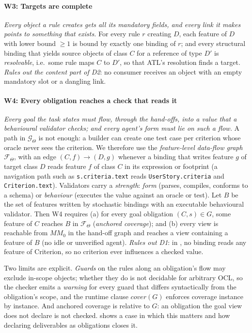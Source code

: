 \documentclass[10pt,a4paper]{article}
\newcommand{\Team}{\Theta}
\newcommand{\W}[1]{\textsf{W#1}}
\newcommand{\D}[1]{\textsf{D#1}}
\newcommand{\MM}{\mathit{MM}}
\newcommand{\cls}[1]{\textsf{#1}}
\newcommand{\code}[1]{\texttt{#1}}
\begin{document}
\paragraph{\W{3}: Targets are complete} \emph{Every object a rule creates
gets all its mandatory fields, and every link it makes points to something
that exists.} For every rule $r$ creating $D$, each feature of $D$ with
lower bound $\ge 1$ is bound by exactly one binding of $r$; and every
structural binding that yields source objects of class $C$ for a reference
of type $D'$ is \emph{resolvable}, i.e.\ some rule maps $C$ to $D'$, so
that ATL's resolution finds a target. \emph{Rules out the content part of
\D{2}}: no consumer receives an object with an empty mandatory slot or a
dangling link.

\paragraph{\W{4}: Every obligation reaches a check that reads it}
\emph{Every goal the task states must flow, through the hand-offs, into a
value that a behavioural validator checks; and every agent's form must lie
on such a flow.} A path in $\mathcal{G}_\Team$ is not enough: a builder can
create one test case per criterion whose oracle never sees the criterion.
We therefore use the \emph{feature-level data-flow graph}
$\mathcal{F}_\Team$, with an edge $(C,f)\to(D,g)$ whenever a binding that
writes feature $g$ of target class $D$ reads feature $f$ of class $C$ in
its expression or footprint (a navigation path such as
\code{s.criteria.text} reads \code{UserStory.criteria} and
\code{Criterion.text}). Validators carry a \emph{strength}: \emph{form}
(parses, compiles, conforms to a schema) or \emph{behaviour} (executes the
value against an oracle or test). Let $B$ be the set of features written
by stochastic bindings with an executable behavioural validator. Then
\W{4} requires (a) for every goal obligation $(C,s)\in G$, some feature of
$C$ reaches $B$ in $\mathcal{F}_\Team$ (\emph{anchored coverage}); and
(b) every view is reachable from $\MM_0$ in the hand-off graph and reaches
a view containing a feature of $B$ (no idle or unverified agent).
\emph{Rules out \D{1}}: in , no binding reads any
feature of \cls{Criterion}, so no criterion ever influences a checked
value.

Two limits are explicit. \emph{Guards} on the rules along an obligation's
flow may exclude in-scope objects; whether they do is not decidable for
arbitrary OCL, so the checker emits a \emph{warning} for every guard that
differs syntactically from the obligation's scope, and the runtime clause
$\mathit{cover}(G)$ enforces coverage instance by instance. And anchored
coverage is relative to $G$: an obligation the goal view does not declare
is not checked.  shows a case in which this matters
and how declaring deliverables as obligations closes it.
\end{document}
